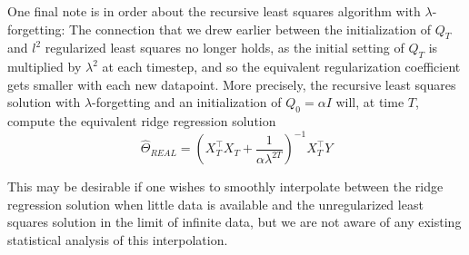 One final note is in order about the recursive least squares algorithm with
$\lambda$-forgetting: The connection that we drew earlier between the
initialization of $Q_T$ and $l^2$ regularized least squares no longer holds, as
the initial setting of $Q_T$ is multiplied by $\lambda^2$ at each timestep, and so
the equivalent regularization coefficient gets smaller with each new
datapoint. More precisely, the recursive least squares solution with
$\lambda$-forgetting and an initialization of $Q_0 = \alpha I$ will, at time
$T$, compute the equivalent ridge regression solution
\begin{equation}
  \hat\Theta_{REAL} = (X_T^\top X_T + \frac{1}{\alpha \lambda^{2T}})^{-1}X_T^\top Y
\end{equation}

This may be desirable if one wishes to smoothly interpolate between
the ridge regression solution when little data is available and the
unregularized least squares solution in the limit of infinite data, but we are
not aware of any existing statistical analysis of this interpolation.
